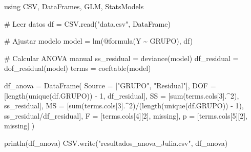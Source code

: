 \documentclass[
  letterpaper,
  DIV=11,
  numbers=noendperiod]{scrartcl}
\newenvironment{Shaded}{\begin{snugshade}}{\end{snugshade}}
\newcommand{\BuiltInTok}[1]{\textcolor[rgb]{0.00,0.23,0.31}{#1}}
\newcommand{\CommentTok}[1]{\textcolor[rgb]{0.37,0.37,0.37}{#1}}
\newcommand{\ConstantTok}[1]{\textcolor[rgb]{0.56,0.35,0.01}{#1}}
\newcommand{\FloatTok}[1]{\textcolor[rgb]{0.68,0.00,0.00}{#1}}
\newcommand{\FunctionTok}[1]{\textcolor[rgb]{0.28,0.35,0.67}{#1}}
\newcommand{\ImportTok}[1]{\textcolor[rgb]{0.00,0.46,0.62}{#1}}
\newcommand{\NormalTok}[1]{\textcolor[rgb]{0.00,0.23,0.31}{#1}}
\newcommand{\OperatorTok}[1]{\textcolor[rgb]{0.37,0.37,0.37}{#1}}
\newcommand{\PreprocessorTok}[1]{\textcolor[rgb]{0.68,0.00,0.00}{#1}}
\newcommand{\StringTok}[1]{\textcolor[rgb]{0.13,0.47,0.30}{#1}}
\begin{document}
\begin{Shaded}
\begin{Highlighting}[]
\ImportTok{using} \BuiltInTok{CSV}\NormalTok{, }\BuiltInTok{DataFrames}\NormalTok{, }\BuiltInTok{GLM}\NormalTok{, }\BuiltInTok{StatsModels}

\CommentTok{\# Leer datos}
\NormalTok{df }\OperatorTok{=}\NormalTok{ CSV.}\FunctionTok{read}\NormalTok{(}\StringTok{"data.csv"}\NormalTok{, DataFrame)}

\CommentTok{\# Ajustar modelo}
\NormalTok{model }\OperatorTok{=} \FunctionTok{lm}\NormalTok{(}\PreprocessorTok{@formula}\NormalTok{(Y }\OperatorTok{\textasciitilde{}}\NormalTok{ GRUPO), df)}

\CommentTok{\# Calcular ANOVA manual}
\NormalTok{ss\_residual }\OperatorTok{=} \FunctionTok{deviance}\NormalTok{(model)}
\NormalTok{df\_residual }\OperatorTok{=} \FunctionTok{dof\_residual}\NormalTok{(model)}
\NormalTok{terms }\OperatorTok{=} \FunctionTok{coeftable}\NormalTok{(model)}

\NormalTok{df\_anova }\OperatorTok{=} \FunctionTok{DataFrame}\NormalTok{(}
\NormalTok{    Source }\OperatorTok{=}\NormalTok{ [}\StringTok{"GRUPO"}\NormalTok{, }\StringTok{"Residual"}\NormalTok{],}
\NormalTok{    DOF }\OperatorTok{=}\NormalTok{ [}\FunctionTok{length}\NormalTok{(}\FunctionTok{unique}\NormalTok{(df.GRUPO)) }\OperatorTok{{-}} \FloatTok{1}\NormalTok{, df\_residual],}
\NormalTok{    SS }\OperatorTok{=}\NormalTok{ [}\FunctionTok{sum}\NormalTok{(terms.cols[}\FloatTok{3}\NormalTok{]}\OperatorTok{.\^{}}\FloatTok{2}\NormalTok{), ss\_residual],}
\NormalTok{    MS }\OperatorTok{=}\NormalTok{ [}\FunctionTok{sum}\NormalTok{(terms.cols[}\FloatTok{3}\NormalTok{]}\OperatorTok{.\^{}}\FloatTok{2}\NormalTok{)}\OperatorTok{/}\NormalTok{(}\FunctionTok{length}\NormalTok{(}\FunctionTok{unique}\NormalTok{(df.GRUPO)) }\OperatorTok{{-}} \FloatTok{1}\NormalTok{), ss\_residual}\OperatorTok{/}\NormalTok{df\_residual],}
\NormalTok{    F }\OperatorTok{=}\NormalTok{ [terms.cols[}\FloatTok{4}\NormalTok{][}\FloatTok{2}\NormalTok{], }\ConstantTok{missing}\NormalTok{],}
\NormalTok{    p }\OperatorTok{=}\NormalTok{ [terms.cols[}\FloatTok{5}\NormalTok{][}\FloatTok{2}\NormalTok{], }\ConstantTok{missing}\NormalTok{]}
\NormalTok{)}

\FunctionTok{println}\NormalTok{(df\_anova)}
\NormalTok{CSV.}\FunctionTok{write}\NormalTok{(}\StringTok{"resultados\_anova\_Julia.csv"}\NormalTok{, df\_anova)}
\end{Highlighting}
\end{Shaded}
\end{document}
